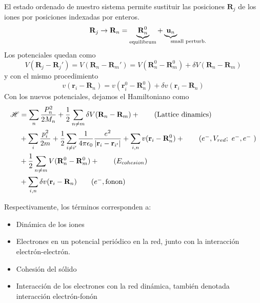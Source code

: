 El estado ordenado de nuestro sistema permite sustituir las posiciones
$\mathbf{R}_j$ de los iones por posiciones indexadas por enteros.
\begin{equation}
  \mathbf{R}_j \rightarrow \mathbf{R}_n =
  \underbrace{\mathbf{R}_n^0}_{\text{equilibrum}} +
  \underbrace{\mathbf{u}_n}_{\mathrlap{\text{small perturb.}}} 
\end{equation}
Los potenciales quedan como
\begin{equation}
  V(\mathbf{R}_j-\mathbf{R}_j') =   V(\mathbf{R}_n-\mathbf{R}_m') =   V(\mathbf{R}_n^0-\mathbf{R}_m^0) + \delta   V(\mathbf{R}_n-\mathbf{R}_m)
\end{equation}
y con el mismo procedimiento
\begin{equation}
  v(\mathbf{r}_i-\mathbf{R}_n)  =   v(\mathbf{r}_i^0-\mathbf{R}_n^0) + \delta   v(\mathbf{r}_i-\mathbf{R}_n)
\end{equation}
Con los nuevos potenciales, dejamos el Hamiltoniano como 
\begin{align}
  \label{eq:finalH}
  \mathcal{H} &= \sum_n \frac{P_n^2}{2M_n}+\frac{1}{2} \sum_{n \neq m}
                \delta   V(\mathbf{R}_n-\mathbf{R}_m) +  \tag{Lattice dinamics}  \\
              &+ \sum_i \frac{p_i^2}{2m}+\frac{1}{2} \sum_{i \neq i'} \frac{1}{4\pi\epsilon_0}\frac{e^2}{\vert \mathbf{r}_i - \mathbf{r}_{i'} \vert} + \sum_{i,n} v(\mathbf{r}_i-\mathbf{R}_n^0) + \tag{$e^-,V_{red};\ e^-,e^-$ } \\
              &+ \frac{1}{2} \sum_{n \neq m} V (\mathbf{R}_n^0 - \mathbf{R}_m^0) + \tag{$E_{cohesion}$}  \\
              &+ \sum_{i,n} \delta v (\mathbf{r}_i-\mathbf{R}_n) \tag{$e^-,\text{fonon}$}
\end{align}

Respectivamente, los términos corresponden a: 
\begin{itemize}
\item Dinámica de los iones
\item Electrones en un potencial periódico en la red, junto con la
  interacción electrón-electrón.
\item Cohesión del sólido
\item Interacción de los electrones con la red dinámica, también
  denotada interacción electrón-fonón
\end{itemize}

